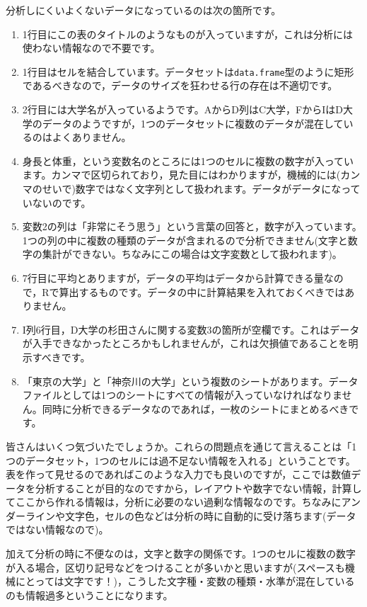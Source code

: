 \documentclass{ltjbook}
\begin{document}
分析しにくいよくないデータになっているのは次の箇所です。
\begin{enumerate}
	\item 1行目にこの表のタイトルのようなものが入っていますが，これは分析には使わない情報なので不要です。
	\item 1行目はセルを結合しています。データセットは\texttt{data.frame}型のように矩形であるべきなので，データのサイズを狂わせる行の存在は不適切です。
	\item 2行目には大学名が入っているようです。AからD列はC大学，FからIはD大学のデータのようですが，1つのデータセットに複数のデータが混在しているのはよくありません。
	\item 身長と体重，という変数名のところには1つのセルに複数の数字が入っています。カンマで区切られており，見た目にはわかりますが，機械的には(カンマのせいで)数字ではなく文字列として扱われます。データがデータになっていないのです。
	\item 変数2の列は「非常にそう思う」という言葉の回答と，数字が入っています。1つの列の中に複数の種類のデータが含まれるので分析できません(文字と数字の集計ができない。ちなみにこの場合は文字変数として扱われます)。
	\item 7行目に平均とありますが，データの平均はデータから計算できる量なので，Rで算出するものです。データの中に計算結果を入れておくべきではありません。
	\item I列6行目，D大学の杉田さんに関する変数3の箇所が空欄です。これはデータが入手できなかったところかもしれませんが，これは欠損値であることを明示すべきです。
	\item 「東京の大学」と「神奈川の大学」という複数のシートがあります。データファイルとしては1つのシートにすべての情報が入っていなければなりません。同時に分析できるデータなのであれば，一枚のシートにまとめるべきです。
\end{enumerate}
皆さんはいくつ気づいたでしょうか。これらの問題点を通じて言えることは「1つのデータセット，1つのセルには過不足ない情報を入れる」ということです。表を作って見せるのであればこのような入力でも良いのですが，ここでは数値データを分析することが目的なのですから，レイアウトや数字でない情報，計算してここから作れる情報は，分析に必要のない過剰な情報なのです。ちなみにアンダーラインや文字色，セルの色などは分析の時に自動的に受け落ちます(データではない情報なので)。

加えて分析の時に不便なのは，文字と数字の関係です。1つのセルに複数の数字が入る場合，区切り記号などをつけることが多いかと思いますが(スペースも機械にとっては文字です！)，こうした文字種・変数の種類・水準が混在しているのも情報過多ということになります。
\end{document}
